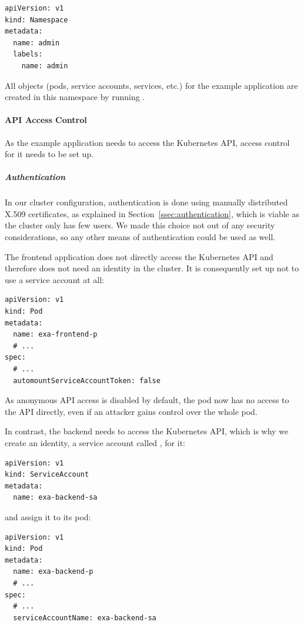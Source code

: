 \begin{verbatim}
apiVersion: v1
kind: Namespace
metadata:
  name: admin
  labels:
    name: admin
\end{verbatim}

All objects (pods, service accounts, services, etc.) for the example application are created in this namespace by running .

\paragraph{API Access Control}

As the example application needs to access the Kubernetes API, access control for it needs to be set up.

\subparagraph{Authentication}
In our cluster configuration, authentication is done using manually distributed X.509 certificates, as explained in Section~\ref{ssec:authentication}, which is viable as the cluster only has few users. We made this choice not out of any security considerations, so any other means of authentication could be used as well. 

The frontend application does not directly access the Kubernetes API and therefore does not need an identity in the cluster. It is consequently set up not to use a service account at all:

\begin{verbatim}
apiVersion: v1
kind: Pod
metadata:
  name: exa-frontend-p
  # ...
spec:
  # ...
  automountServiceAccountToken: false
\end{verbatim}

As anonymous API access is disabled by default, the pod  now has no access to the API directly, even if an attacker gains control over the whole pod.

In contrast, the backend needs to access the Kubernetes API, which is why we create an identity, a service account called , for it:

\begin{verbatim}
apiVersion: v1
kind: ServiceAccount
metadata:
  name: exa-backend-sa
\end{verbatim}

and assign it to its pod:

\begin{verbatim}
apiVersion: v1
kind: Pod
metadata:
  name: exa-backend-p
  # ...
spec:
  # ...
  serviceAccountName: exa-backend-sa
\end{verbatim}

